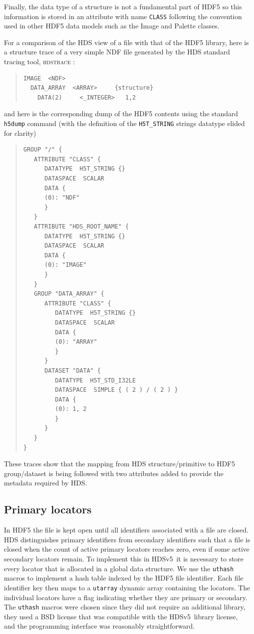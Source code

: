 \documentclass[final,authoryear,5p,times,twocolumn]{elsarticle}
\newcommand{\new}{HDSv5}
\begin{document}
Finally, the data type of a structure is not a fundamental part of
HDF5 so this information is stored in an attribute with name
\texttt{CLASS} following the convention used in other HDF5 data models
such as the Image and Palette classes.

For a comparison of the HDS view of a file with that of the HDF5
library, here is a structure trace of a very simple NDF file generated
by the HDS standard tracing tool, \textsc{hdstrace} \citep{SUN102}:

\begin{quote}
\small
\begin{verbatim}
IMAGE  <NDF>
  DATA_ARRAY  <ARRAY>     {structure}
    DATA(2)     <_INTEGER>   1,2
\end{verbatim}
\end{quote}
and here is the corresponding dump of the HDF5 contents using the
standard \texttt{h5dump} command (with the definition of the
\texttt{H5T\_STRING} strings datatype elided for clarity)
\begin{quote}
\small
\begin{verbatim}
GROUP "/" {
   ATTRIBUTE "CLASS" {
      DATATYPE  H5T_STRING {}
      DATASPACE  SCALAR
      DATA {
      (0): "NDF"
      }
   }
   ATTRIBUTE "HDS_ROOT_NAME" {
      DATATYPE  H5T_STRING {}
      DATASPACE  SCALAR
      DATA {
      (0): "IMAGE"
      }
   }
   GROUP "DATA_ARRAY" {
      ATTRIBUTE "CLASS" {
         DATATYPE  H5T_STRING {}
         DATASPACE  SCALAR
         DATA {
         (0): "ARRAY"
         }
      }
      DATASET "DATA" {
         DATATYPE  H5T_STD_I32LE
         DATASPACE  SIMPLE { ( 2 ) / ( 2 ) }
         DATA {
         (0): 1, 2
         }
      }
   }
}
\end{verbatim}
\end{quote}

These traces show that the mapping from HDS structure/primitive to
HDF5 group/dataset is being followed with two attributes added to
provide the metadata required by HDS.

\subsection{Primary locators}

In HDF5 the file is kept open until all identifiers associated with a
file are closed. HDS distinguishes primary identifiers from secondary
identifiers such that a file is closed when the count of active
primary locators reaches zero, even if some active secondary locators
remain. To implement this in
\new\ it is necessary to store every locator that is allocated in a
global data structure. We use the \texttt{uthash} macros \citep{uthash} to
implement a hash table indexed by the HDF5 file identifier. Each
file identifier key then maps to a \texttt{utarray} dynamic array
containing the locators. The individual locators have a flag indicating
whether they are primary or secondary.
The \texttt{uthash} macros were
chosen since they did not require an additional library, they used a
BSD license that was compatible with the \new\ library license, and
the programming interface was reasonably straightforward.
\end{document}
